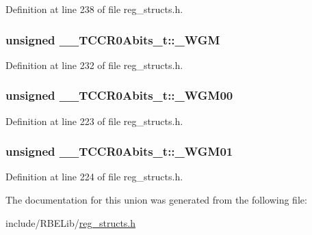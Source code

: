 Definition at line 238 of file reg\+\_\+structs.\+h.

\hypertarget{union_____t_c_c_r0_abits__t_ab73fd41ef1e6d8482c94d8a85efdaf86}{
\subsubsection[{\+\_\+\+W\+G\+M}]{\setlength{\rightskip}{0pt plus 5cm}unsigned \+\_\+\+\_\+\+T\+C\+C\+R0\+Abits\+\_\+t\+::\+\_\+\+W\+G\+M}}\label{union_____t_c_c_r0_abits__t_ab73fd41ef1e6d8482c94d8a85efdaf86}


Definition at line 232 of file reg\+\_\+structs.\+h.

\hypertarget{union_____t_c_c_r0_abits__t_afdcfcd3db98778bccc47a0940853a1a6}{
\subsubsection[{\+\_\+\+W\+G\+M00}]{\setlength{\rightskip}{0pt plus 5cm}unsigned \+\_\+\+\_\+\+T\+C\+C\+R0\+Abits\+\_\+t\+::\+\_\+\+W\+G\+M00}}\label{union_____t_c_c_r0_abits__t_afdcfcd3db98778bccc47a0940853a1a6}


Definition at line 223 of file reg\+\_\+structs.\+h.

\hypertarget{union_____t_c_c_r0_abits__t_a92dde5e2a5280917d663ebd4730f73be}{
\subsubsection[{\+\_\+\+W\+G\+M01}]{\setlength{\rightskip}{0pt plus 5cm}unsigned \+\_\+\+\_\+\+T\+C\+C\+R0\+Abits\+\_\+t\+::\+\_\+\+W\+G\+M01}}\label{union_____t_c_c_r0_abits__t_a92dde5e2a5280917d663ebd4730f73be}


Definition at line 224 of file reg\+\_\+structs.\+h.



The documentation for this union was generated from the following file\+:\begin{DoxyCompactItemize}
\item 
include/\+R\+B\+E\+Lib/\hyperlink{reg__structs_8h}{reg\+\_\+structs.\+h}\end{DoxyCompactItemize}
